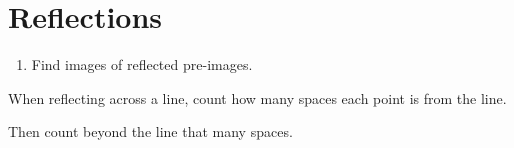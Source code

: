 \documentclass{article}
\begin{document}
\section*{Reflections}

\begin{tcolorbox}[colframe=orange!70!white, coltitle=black, title=\textbf{Today I Can}]
\begin{enumerate}
    \item Find images of reflected pre-images.
\end{enumerate}
\end{tcolorbox}
\bigskip 

When reflecting across a line, count how many spaces each point is from the line.
\newline

Then count beyond the line that many spaces.
\newline
\end{document}
